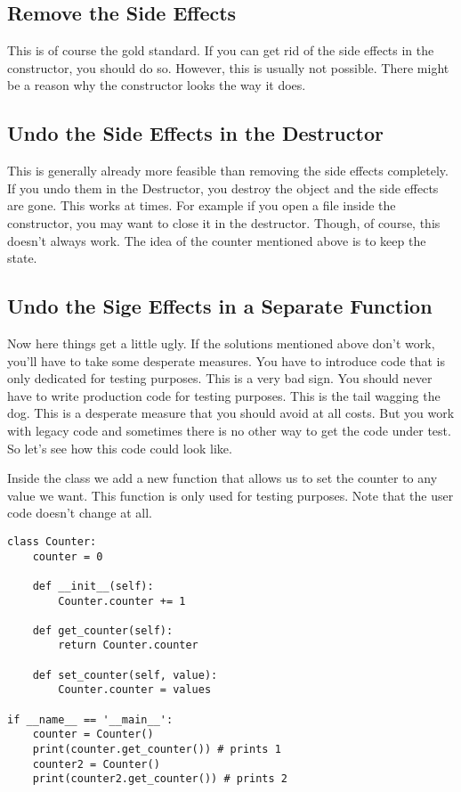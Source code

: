 \subsection{Remove the Side Effects}

This is of course the gold standard. If you can get rid of the side effects in the constructor, you should do so. However, this is usually not possible. There might be a reason why the constructor looks the way it does.

\subsection{Undo the Side Effects in the Destructor}

This is generally already more feasible than removing the side effects completely. If you undo them in the Destructor, you destroy the object and the side effects are gone. This works at times. For example if you open a file inside the constructor, you may want to close it in the destructor. Though, of course, this doesn't always work. The idea of the counter mentioned above is to keep the state.

\subsection{Undo the Sige Effects in a Separate Function}

Now here things get a little ugly. If the solutions mentioned above don't work, you'll have to take some desperate measures. You have to introduce code that is only dedicated for testing purposes. This is a very bad sign. You should never have to write production code for testing purposes. This is the tail wagging the dog. This is a desperate measure that you should avoid at all costs. But you work with legacy code and sometimes there is no other way to get the code under test. So let's see how this code could look like.

Inside the class  we add a new function  that allows us to set the counter to any value we want. This function is only used for testing purposes. Note that the user code doesn't change at all.

\begin{programcode}{}
\begin{verbatim}
class Counter:
    counter = 0

    def __init__(self):
        Counter.counter += 1

    def get_counter(self):
        return Counter.counter

    def set_counter(self, value):
        Counter.counter = values

if __name__ == '__main__':
    counter = Counter()
    print(counter.get_counter()) # prints 1
    counter2 = Counter()
    print(counter2.get_counter()) # prints 2
\end{verbatim}
\end{programcode}

